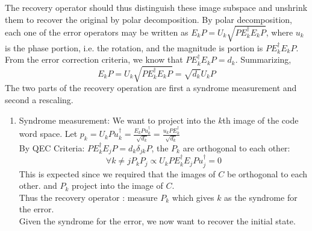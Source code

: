 The recovery operator should thus distinguish these image subspace and unshrink them to recover the original by polar decomposition. By polar decomposition, each one of the error operators may be written as $E_k P = U_k \sqrt{PE_k^\dagger E_k P}$, where $u_k$ is the phase portion, i.e. the rotation, and the magnitude is portion is $PE_k^\dagger E_k P$. From the error correction criteria, we know that $PE_k^\dagger E_k P = d_k$. Summarizing,
\begin{equation}
    E_kP = U_k \sqrt{PE_k^\dagger E_k P} = \sqrt{d_k}U_k P 
\end{equation}
The two parts of the recovery operation are first a syndrome measurement and second a rescaling. \\
\begin{enumerate}
    \item Syndrome measurement: We want to project into the $k$th image of the code word space. Let $p_k = U_kPu_k^\dagger = \frac{E_kPu_k^\dagger}{\sqrt{d_k}} = \frac{u_kPE_k^\dagger}{\sqrt{d_k}}$ \\
    By QEC Criteria: $PE_k^\dagger E_jP = d_k \delta_{jk} P$, the $P_k$ are orthogonal to each other: 
    \begin{equation}
        \forall k \neq j\! P_kP_j \propto U_kPE_k^\dagger E_jPu_j^\dagger = 0 
    \end{equation}This is expected since we required that the images of $C$ be orthogonal to each other. and $P_k$ project into the image of $C$. \\
    Thus the recovery operator : measure $P_k$ which gives $k$ as the syndrome for the error. \\

    Given the syndrome for the error, we now want to recover the initial state.


\end{enumerate}
